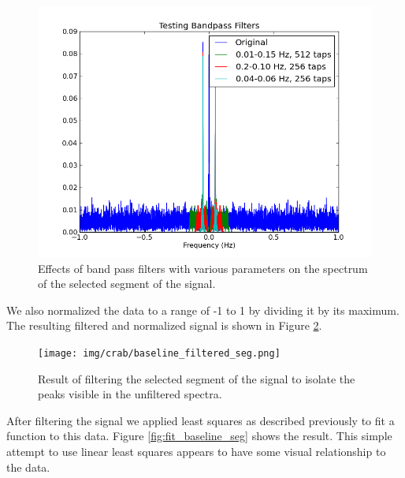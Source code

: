 \documentclass{article}
\begin{document}
    \begin{figure}[h!]
    \centering
    \includegraphics[scale=0.5]{img/crab/bandpass_test_d.png}
    \caption{Effects of band pass filters with various parameters on the
    spectrum of the selected segment of the signal.}
    \label{fig:bandpass_test_d}
    \end{figure}


    We also normalized the data to a range of -1 to 1 by dividing it by its
    maximum.  The resulting filtered and normalized signal is shown in Figure
    \ref{fig:baseline_filtered_seg}.

    \begin{figure}[h!]
    \centering
    \texttt{[image: img/crab/baseline\_filtered\_seg.png]}
    \caption{Result of filtering the selected segment of the signal to isolate
    the peaks visible in the unfiltered spectra.}
    \label{fig:baseline_filtered_seg}
    \end{figure}

    After filtering the signal we applied least squares as described previously
    to fit a function to this data. Figure \ref{fig:fit_baseline_seg} shows the
    result. This simple attempt to use linear least squares appears to have some
    visual relationship to the data.
\end{document}
